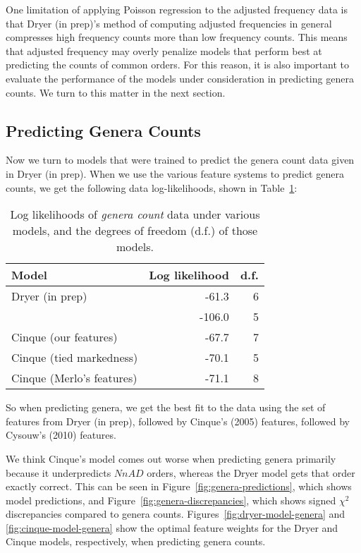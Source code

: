 \documentclass[11pt]{article}
\begin{document}
One limitation of applying Poisson regression to the adjusted
frequency data is that Dryer (in prep)'s method of computing adjusted
frequencies in general compresses high frequency counts more than low
frequency counts.  This means that adjusted frequency may overly penalize
models that perform best at predicting the counts of common orders.
For this reason, it is also important to evaluate the performance of the models under
consideration in predicting genera counts.  We turn to this matter in
the next section.

\subsection{Predicting Genera Counts}

Now we turn to models that were trained to predict the genera count data given in Dryer (in prep).
When we use the various feature systems to predict genera counts, we get the following data log-likelihoods, shown in Table~\ref{tab:genera-likelihoods}:

\begin{table}
  \centering
  \begin{tabular}{|l|r|r|}
    \hline
    Model & Log likelihood & d.f. \\
    \hline
    Dryer (in prep) & -61.3 & 6 \\
    \citet{cysouw2010dealing} & -106.0 & 5 \\
    Cinque (our features) & -67.7 & 7 \\
    Cinque (tied markedness) & -70.1 & 5 \\
    Cinque (Merlo's features) & -71.1 & 8 \\
    \hline 
  \end{tabular}
  \caption{Log likelihoods of \emph{genera count} data under various models, and the degrees of freedom (d.f.) of those models.}  
  \label{tab:genera-likelihoods}
\end{table}

So when predicting genera, we get the best fit to the data using the set of features from Dryer (in prep), followed by Cinque's (2005) features, followed by Cysouw's (2010) features.

We think Cinque's model comes out worse when predicting genera primarily because it underpredicts $NnAD$ orders, whereas the Dryer model gets that order exactly correct. This can be seen in Figure~\ref{fig:genera-predictions}, which shows model predictions, and Figure~\ref{fig:genera-discrepancies}, which shows signed $\chi^2$ discrepancies compared to genera counts.
Figures~\ref{fig:dryer-model-genera} and \ref{fig:cinque-model-genera} show the optimal feature weights for the Dryer and Cinque models, respectively, when predicting genera counts.
\end{document}
